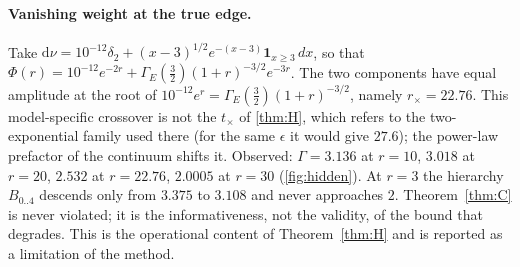 \documentclass[11pt]{article}
\theoremstyle{definition}
\theoremstyle{remark}
\newcommand{\dnu}{\mathrm{d}\nu}
\begin{document}
\paragraph{Vanishing weight at the true edge.}
Take $\dnu=10^{-12}\delta_{2}+(x-3)^{1/2}e^{-(x-3)}\mathbf{1}_{x\ge3}\,dx$,
so that $\Phi(r)=10^{-12}e^{-2r}+\Gamma_{E}(\tfrac32)(1+r)^{-3/2}e^{-3r}$.
The two components have equal amplitude at the root of
$10^{-12}e^{r}=\Gamma_{E}(\tfrac32)(1+r)^{-3/2}$, namely $r_{\times}=22.76$.
This model-specific crossover is not the $t_{\times}$ of
\cref{thm:H}, which refers to the two-exponential family used there (for the
same $\epsilon$ it would give $27.6$); the power-law prefactor of the
continuum shifts it. Observed: $\Gamma=3.136$ at $r=10$, $3.018$ at $r=20$,
$2.532$ at $r=22.76$, $2.0005$ at $r=30$ (\cref{fig:hidden}). At $r=3$ the hierarchy
$B_{0..4}$ descends only from $3.375$ to $3.108$ and never approaches $2$.
Theorem~\ref{thm:C} is never violated; it is the informativeness, not the
validity, of the bound that degrades. This is the operational content of
Theorem~\ref{thm:H} and is reported as a limitation of the method.
\end{document}
